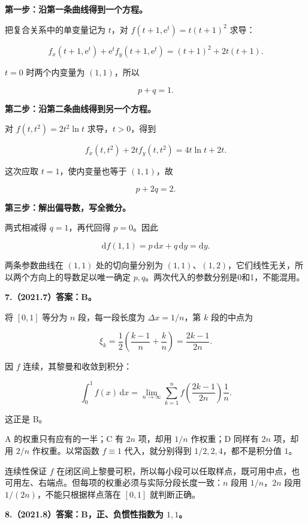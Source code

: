\documentclass[UTF8,11pt,fontset=windows]{ctexart}
\begin{document}
\textbf{第一步：沿第一条曲线得到一个方程。}

把复合关系中的单变量记为 $t$，对 $f(t+1,\mathrm e^t)=t(t+1)^2$ 求导：

$$
f_x(t+1,\mathrm e^t)+\mathrm e^t f_y(t+1,\mathrm e^t)
=(t+1)^2+2t(t+1).
$$

$t=0$ 时两个内变量为 $(1,1)$，所以

$$
p+q=1.
$$

\textbf{第二步：沿第二条曲线得到另一个方程。}

对 $f(t,t^2)=2t^2\ln t$ 求导，$t>0$，得到

$$
f_x(t,t^2)+2t f_y(t,t^2)=4t\ln t+2t.
$$

这次应取 $t=1$，使内变量也等于 $(1,1)$，故

$$
p+2q=2.
$$

\textbf{第三步：解出偏导数，写全微分。}

两式相减得 $q=1$，再代回得 $p=0$。因此

$$
\boxed{\mathrm df(1,1)=p\,\mathrm dx+q\,\mathrm dy=\mathrm dy}.
$$

两条参数曲线在 $(1,1)$ 处的切向量分别为 $(1,1)$、$(1,2)$，它们线性无关，所以两个方向上的导数足以唯一确定 $p,q$。两次代入的参数分别是0和1，不能混用。

\clearpage

\textbf{7.（2021.7）答案：B。}

将 $[0,1]$ 等分为 $n$ 段，每一段长度为 $\Delta x=1/n$，第 $k$ 段的中点为

$$
\xi_k=\frac12\left(\frac{k-1}{n}+\frac{k}{n}\right)=\frac{2k-1}{2n}.
$$

因 $f$ 连续，其黎曼和收敛到积分：

$$
\int_0^1f(x)\,\mathrm dx
=\lim_{n\to\infty}\sum_{k=1}^n
f\left(\frac{2k-1}{2n}\right)\frac1n.
$$

这正是 B。

A 的权重只有应有的一半；C 有 $2n$ 项，却用 $1/n$ 作权重；D 同样有 $2n$ 项，却用 $2/n$ 作权重。以常函数 $f\equiv1$ 代入，就分别得到 $1/2,2,4$，都不是积分值 $1$。

连续性保证 $f$ 在闭区间上黎曼可积，所以每小段可以任取样点，既可用中点，也可用左、右端点。但每项的权重必须与实际分段长度一致：$n$ 段用 $1/n$，$2n$ 段用 $1/(2n)$，不能只根据样点落在 $[0,1]$ 就判断正确。

\clearpage

\textbf{8.（2021.8）答案：B，正、负惯性指数为 $1,1$。}
\end{document}
